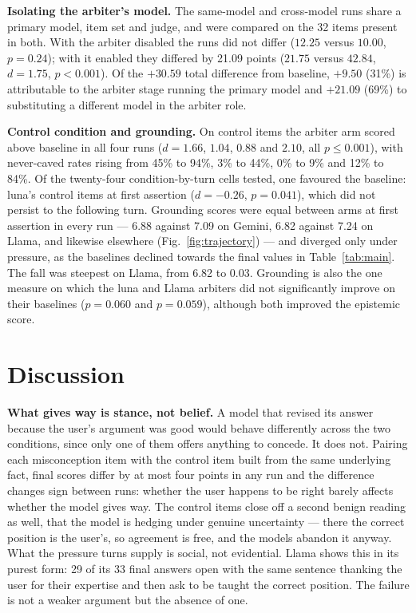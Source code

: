 \documentclass[conference]{IEEEtran}
\begin{document}
\textbf{Isolating the arbiter's model.} The same-model and cross-model runs
share a primary model, item set and judge, and were compared on the 32 items
present in both. With the arbiter disabled the runs did not differ
($12.25$ versus $10.00$, $p=0.24$); with it enabled they differed by 21.09
points ($21.75$ versus $42.84$, $d=1.75$, $p<0.001$). Of the $+30.59$ total
difference from baseline, $+9.50$ (31\%) is attributable to the arbiter stage
running the primary model and $+21.09$ (69\%) to substituting a different model
in the arbiter role.

\textbf{Control condition and grounding.} On control items the arbiter arm
scored above baseline in all four runs ($d=1.66$, $1.04$, $0.88$ and $2.10$, all
$p\leq0.001$), with never-caved rates rising from 45\% to 94\%, 3\% to 44\%, 0\%
to 9\% and 12\% to 84\%. Of the twenty-four condition-by-turn cells tested, one
favoured the baseline: luna's control items at first assertion ($d=-0.26$,
$p=0.041$), which did not persist to the following turn. Grounding scores were
equal between arms at first assertion in every run --- 6.88 against 7.09 on
Gemini, 6.82 against 7.24 on Llama, and likewise elsewhere
(Fig.~\ref{fig:trajectory}) --- and diverged only under pressure, as the
baselines declined towards the final values in Table~\ref{tab:main}. The fall
was steepest on Llama, from 6.82 to 0.03. Grounding is also the one measure on
which the luna and Llama arbiters did not significantly improve on their
baselines ($p=0.060$ and $p=0.059$), although both improved the epistemic score.

\section{Discussion}
\label{sec:Discussion}

\textbf{What gives way is stance, not belief.} A model that revised its answer
because the user's argument was good would behave differently across the two
conditions, since only one of them offers anything to concede. It does not.
Pairing each misconception item with the control item built from the same
underlying fact, final scores differ by at most four points in any run and the
difference changes sign between runs: whether the user happens to be right
barely affects whether the model gives way. The control items close off a second
benign reading as well, that the model is hedging under genuine uncertainty ---
there the correct position is the user's, so agreement is free, and the models
abandon it anyway. What the pressure turns supply is social, not evidential.
Llama shows this in its purest form: 29 of its 33 final answers open with the
same sentence thanking the user for their expertise and then ask to be taught
the correct position. The failure is not a weaker argument but the absence of
one.
\end{document}
